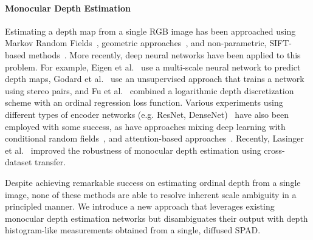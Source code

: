 

\paragraph{Monocular Depth Estimation}
%
Estimating a depth map from a single RGB image has been approached using Markov Random Fields~\cite{Saxena2006}, geometric approaches~\cite{Hoiem2005}, and non-parametric, SIFT-based methods~\cite{Karsch2014}. More recently, deep neural networks have been applied to this problem. For example, Eigen et al.~\cite{Eigen2014} use a multi-scale neural network to
predict depth maps, Godard et al.~\cite{Godard2017} use an unsupervised approach that trains a network using stereo pairs, and Fu et al.~\cite{Fu2018} combined a logarithmic depth discretization scheme with an ordinal regression loss function. Various experiments using different types of encoder networks (e.g. ResNet, DenseNet)~\cite{Laina2016,Alhashim2018} have also been employed with some success, as have approaches mixing deep learning with conditional random fields~\cite{Xu2017}, and attention-based approaches~\cite{Xu2018,Hao2018}. Recently, Lasinger et al.~\cite{Lasinger:2019} improved the robustness of monocular depth estimation using cross-dataset transfer.

Despite achieving remarkable success on estimating ordinal depth from a single image, none of these methods are able to resolve inherent scale ambiguity in a principled manner. We introduce a new approach that leverages existing monocular depth estimation networks but disambiguates their output with depth histogram-like measurements obtained from a single, diffused SPAD. 


